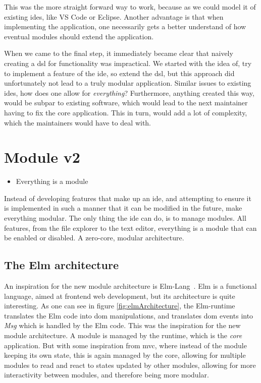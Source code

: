 This was the more straight forward way to work, because as we could model it of
existing \gls*{ide}s, like VS Code or Eclipse. Another advantage is that when
implementing the application, one necessarily gets a better understand of how
eventual modules should extend the application.

When we came to the final step, it immediately became clear that naively
creating a \gls*{dsl} for functionality was impractical. We started with the
idea of, try to implement a feature of the \gls*{ide}, so extend the \gls*{dsl},
but this approach did unfortunately not lead to a truly modular application.
Similar issues to existing \gls*{ide}s, how does one allow for
\textit{everything}? Furthermore, anything created this way, would be subpar to
existing software, which would lead to the next maintainer having to fix the
core application. This in turn, would add a lot of complexity, which the
maintainers would have to deal with.


\section{Module v2} \label{sec:mod2}

\begin{itemize}
  \item Everything is a module
\end{itemize}

Instead of developing features that make up an \gls*{ide}, and attempting to
ensure it is implemented in such a manner that it can be modified in the future,
make everything modular. The only thing the \gls*{ide} can do, is to manage
modules. All features, from the file explorer to the text editor, everything is
a module that can be enabled or disabled. A zero-core, modular architecture.

\subsection{The Elm architecture}

An inspiration for the new module architecture is Elm-Lang~\cite{elmLang}. Elm
is a functional language, aimed at frontend web development, but its
architecture is quite interesting. As one can see in figure
\ref{fig:elmArchitecture}, the Elm-runtime translates the Elm code into
\gls*{dom} manipulations, and translates \gls*{dom} events into \textit{Msg}
which is handled by the Elm code. This was the inspiration for the new module
architecture. A module is managed by the runtime, which is the \textit{core}
application. But with some inspiration from \gls*{mvc}, where instead of the
module keeping its own state, this is again managed by the core, allowing for
multiple modules to read and react to states updated by other modules, allowing
for more interactivity between modules, and therefore being more modular.

